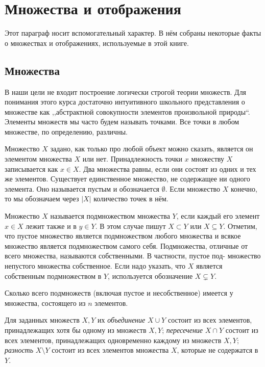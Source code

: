 \section{Множества и отображения}
Этот параграф носит вспомогательный характер. В нём собраны некоторые факты о множествах и отображениях, используемые в этой книге.
\subsection{Множества}
В наши цели не входит построение логически строгой теории множеств. Для
понимания этого курса достаточно интуитивного школьного представления о множестве как ,,абстрактной совокупности элементов произвольной природы``. Элементы множеств мы часто будем называть точками. Все точки в любом множестве, по определению, различны.

Множество $X$ задано, как только про любой объект можно сказать, является он элементом множества $X$ или нет. Принадлежность точки $x$ множеству $X$ записывается как $x\in X$. Два множества равны, если они состоят из одних и тех же элементов. Существует единственное множество, не содержащее ни одного элемента. Оно называется пустым и обозначается $\emptyset$. Если множество $X$ конечно, то мы обозначаем через $|X|$ количество точек в нём. 

Множество $X$ называется подмножеством множества $Y$, если каждый его элемент $x\in X$ лежит также и в $y \in Y$. В этом случае пишут $X \subset Y$ или $X \subseteq Y$. Отметим, что пустое множество является подмножеством любого множества и всякое множество является подмножеством самого себя. Подмножества, отличные от всего множества, называются собственными. В частности, пустое под-
множество непустого множества собственное. Если надо указать, что $X$ является собственным подмножеством в $Y$, используется обозначение $X \subsetneq Y$.

\begin{practice}
    Сколько всего подмножеств (включая пустое и несобственное) имеется у множества, состоящего из $n$ элементов.
\end{practice}

Для заданных множеств $X, Y$ их \emph{объединение} $X \cup Y$ состоит из всех элементов, принадлежащих хотя бы одному из множеств $X, Y$; \emph{пересечение} $X \cap Y$ состоит из всех элементов, принадлежащих одновременно каждому из множеств $X, Y$; \emph{разность} $X \setminus Y$ состоит из всех элементов множества $X$, которые не содержатся в $Y$.

